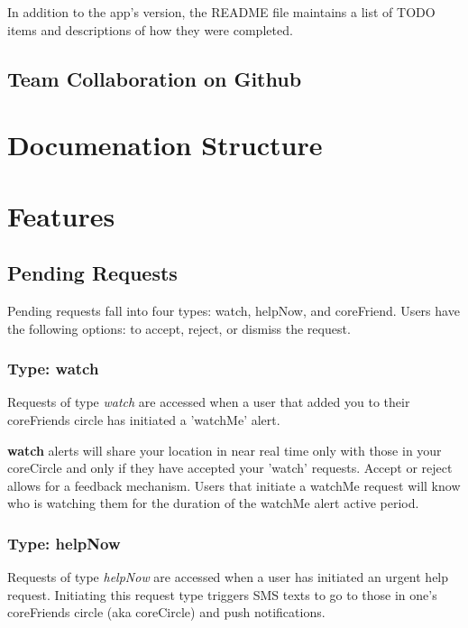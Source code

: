 In addition to the app's version, the README file maintains a list of TODO items and 
descriptions of how they were completed.


\subsection{Team Collaboration on Github}
\href{https://help.github.com/articles/resolving-merge-conflicts}{\color{blue}{Resolving merge conflicts}}
\section{Documenation Structure}


\section{Features}

\subsection{Pending Requests}
  Pending requests fall into four types: watch, helpNow, and coreFriend.
  Users have the following options: to accept, reject, or dismiss the request.
  
  
  
\subsubsection{Type: watch}
  Requests of type \emph{watch} are accessed when a user that added you to their 
  coreFriends circle has initiated a 'watchMe' alert.
  
  \textbf{watch} alerts will share your location in near real time only with those
  in your coreCircle and only if they have accepted your 'watch' requests.  Accept or 
  reject allows for a feedback mechanism.  Users that initiate a watchMe request will
  know who is watching them for the duration of the watchMe alert active period.
  
\subsubsection{Type: helpNow}
  Requests of type \emph{helpNow} are accessed when a user has initiated an urgent help
  request.  Initiating this request type triggers SMS texts to go to those in
  one's coreFriends circle (aka coreCircle) and push notifications.
  

